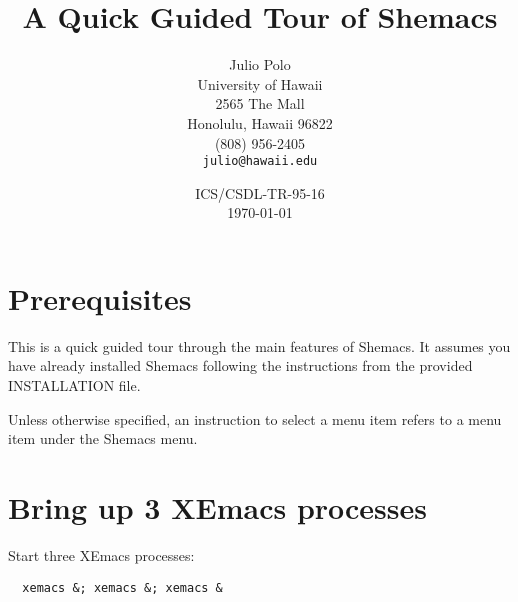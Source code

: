 




\title{A Quick Guided Tour of Shemacs}

\author{Julio Polo\\ 
        University of Hawaii\\
        2565 The Mall\\ 
        Honolulu, Hawaii 96822\\ 
        (808) 956-2405\\
        {\tt julio@hawaii.edu}}

\date{ICS/CSDL-TR-95-16\\\today}

\maketitle

\newpage

\section{Prerequisites}

This is a quick guided tour through the main features of Shemacs.  It
assumes you have already installed Shemacs following the instructions from
the provided INSTALLATION file.

Unless otherwise specified, an instruction to select a menu item refers to
a menu item under the Shemacs menu.

\section{Bring up 3 XEmacs processes}

Start three XEmacs processes:

\small\begin{verbatim}
  xemacs &; xemacs &; xemacs &
\end{verbatim}\normalsize


